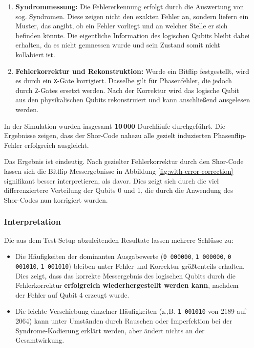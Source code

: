 \begin{enumerate}
\\
  \item \textbf{Syndrommessung:}  
  Die Fehlererkennung erfolgt durch die Auswertung von sog. Syndromen. Diese zeigen nicht den exakten Fehler an, sondern liefern ein Muster, das angibt, ob ein Fehler vorliegt und an welcher Stelle er sich befinden könnte. Die eigentliche Information des logischen Qubits bleibt dabei erhalten, da es nicht gemnessen wurde und sein Zustand somit nicht kollabiert ist.
\\
  \item \textbf{Fehlerkorrektur und Rekonstruktion:}  
  Wurde ein Bitflip festgestellt, wird es durch ein \texttt{X}-Gate korrigiert. Dasselbe gilt für Phasenfehler, die jedoch durch \texttt{Z}-Gates ersetzt werden. Nach der Korrektur wird das logische Qubit aus den physikalischen Qubits rekonstruiert und kann anschließend ausgelesen werden.
\end{enumerate}

In der Simulation wurden insgesamt \textbf{10\,000} Durchläufe durchgeführt. Die Ergebnisse zeigen, dass der Shor-Code nahezu alle gezielt induzierten Phasenflip-Fehler erfolgreich ausgleicht. 


Das Ergebnis ist eindeutig. Nach gezielter Fehlerkorrektur durch den Shor-Code lassen sich die Bitflip-Messergebnisse in Abbildung \ref{fig:with-error-correction} signifikant besser interpretieren, als davor. Dies zeigt sich durch die viel differenziertere Verteilung der Qubits 0 und 1, die durch die Anwendung des Shor-Codes nun korrigiert wurden.

\subsubsection{Interpretation}

Die aus dem Test-Setup abzuleitenden Resultate lassen mehrere Schlüsse zu:

\begin{itemize}
\item Die Häufigkeiten der dominanten Ausgabewerte (\texttt{0 000000}, \texttt{1 000000}, \texttt{0 001010}, \texttt{1 001010}) bleiben unter Fehler und Korrektur größtenteils erhalten. Dies zeigt, dass das korrekte Messergebnis des logischen Qubits durch die Fehlerkorrektur \textbf{erfolgreich wiederhergestellt werden kann}, nachdem der Fehler auf Qubit 4 erzeugt wurde.


\item Die leichte Verschiebung einzelner Häufigkeiten (z.,B. \texttt{1 001010} von 2189 auf 2064) kann unter Umständen durch Rauschen oder Imperfektion bei der Syndrome-Kodierung erklärt werden, aber ändert nichts an der Gesamtwirkung.
\end{itemize}

